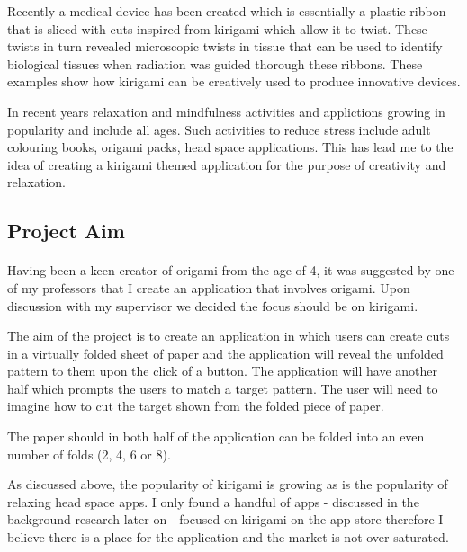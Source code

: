\documentclass[11pt]{article}
\begin{document}
                
               Recently a medical device has been created which is essentially a  plastic ribbon that is sliced with cuts inspired from kirigami which allow it to twist. These twists in turn revealed microscopic twists in tissue that can be used to identify biological tissues when radiation was guided thorough these ribbons. %
               These examples show how kirigami can be creatively used to produce innovative devices.
                
                In recent years relaxation and mindfulness activities and applictions growing in popularity and include all ages. Such activities to reduce stress include adult colouring books, origami packs, head space applications. This has lead me to the idea of creating a kirigami themed application for the purpose of creativity and relaxation.
    
            \subsection{Project Aim}
            
                 \paragraph{} 
                 
                  Having been a keen creator of origami from the age of 4, it was suggested by one of my professors that I create an application that involves origami. Upon discussion with my supervisor we decided the focus should be on kirigami. 
                  
                  The aim of the project is to create an application in which users can create cuts in a virtually folded sheet of paper and the application will reveal the unfolded pattern to them upon the click of a button. The application will have another half which prompts the users to match a target pattern. The user will need to imagine how to cut the target shown from the folded piece of paper.
                  
                  The paper should in both half of the application can be folded into an even number of folds (2, 4, 6 or 8).
                  
                  As discussed above, the popularity of kirigami is growing as is the popularity of relaxing head space apps. I only found a handful of apps - discussed in the background research later on - focused on kirigami on the app store therefore I believe there is a place for the application and the market is not over saturated.
                 
\end{document}
